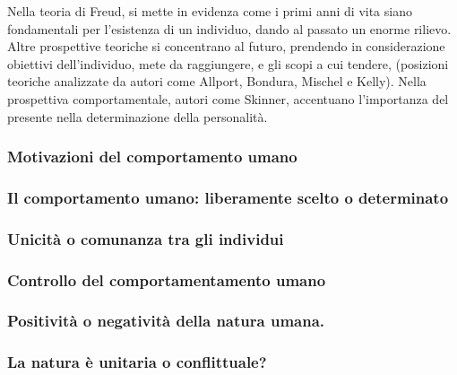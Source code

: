 \documentclass{subfiles}
\begin{document}
Nella teoria di Freud, si mette in evidenza come i primi anni di vita siano fondamentali per l'esistenza di un individuo,
dando al passato un enorme rilievo. Altre prospettive teoriche si concentrano al futuro, prendendo in considerazione obiettivi
dell'individuo, mete da raggiungere, e gli scopi a cui tendere, (posizioni teoriche analizzate da autori come Allport, Bondura, Mischel e Kelly).
Nella prospettiva comportamentale, autori come Skinner, accentuano l'importanza del presente nella determinazione della personalità.

\subsubsection{Motivazioni del comportamento umano}


\subsubsection{Il comportamento umano: liberamente scelto o determinato}


\subsubsection{Unicità o comunanza tra gli individui}


\subsubsection{Controllo del comportamentamento umano}


\subsubsection{Positività o negatività della natura umana.}


\subsubsection{La natura è unitaria o conflittuale?}

\end{document}
